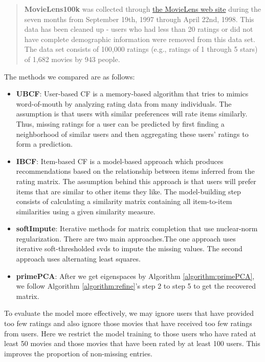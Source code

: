 \documentclass[a4paper,12pt,authoryear]{elegantpaper}
\begin{document}
    \begin{quotation}
        \noindent
        \textbf{MovieLens100k} was collected through \href{https://movielens.org/}{the MovieLens web site} during the seven months from September 19th,  1997 through April 22nd, 1998. This data has been cleaned up - users who had less than 20 ratings or did not have complete demographic information were removed from this data set. The data set consists of 100,000 ratings (e.g., ratings of 1 through 5 stars) of 1,682 movies by 943 people.
    \end{quotation}

    The methods we compared are as follows:
    \begin{itemize}
        \item \textbf{UBCF}: User-based CF is a memory-based algorithm that tries to mimics word-of-mouth by analyzing rating data from many individuals. The assumption is that users with similar preferences will rate items similarly. Thus, missing ratings for a user can be predicted by first finding a neighborhood of similar users and then aggregating these users' ratings to form a prediction. \citep{hahsler_recommenderlab_2020}
        \item \textbf{IBCF}: Item-based CF is a model-based approach which produces recommendations based on the relationship between items inferred from the rating matrix. The assumption behind this approach is that users will prefer items that are similar to other items they like. The model-building step consists of calculating a similarity matrix containing all item-to-item similarities using a given similarity measure. \citep{hahsler_recommenderlab_2020}
        \item \textbf{softImpute}: Iterative methods for matrix completion that use nuclear-norm regularization. There are two main approaches.The one approach uses iterative soft-thresholded svds to impute the missing values. The second approach uses alternating least squares. \citep{mazumder_softimpute_2015}
        \item \textbf{primePCA}: After we get eigenspaces by Algorithm \ref{algorithm:primePCA}, we follow Algorithm \ref{algorithm:refine}'s step 2 to step 5 to get the recovered matrix.
    \end{itemize}

    To evaluate the model more effectively, we may ignore users that have provided too few ratings and also ignore those movies that have received too few ratings from users. Here we restrict the model training to those users who have rated at least 50 movies and those movies that have been rated by at least 100 users. This improves the proportion of non-missing entries.
\end{document}
